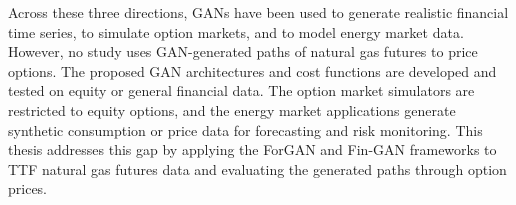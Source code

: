 Across these three directions, GANs have been used to generate realistic financial time series, to simulate option markets, and to model energy market data. However, no study uses GAN-generated paths of natural gas futures to price options. The proposed GAN architectures and cost functions are developed and tested on equity or general financial data. The option market simulators are restricted to equity options, and the energy market applications generate synthetic consumption or price data for forecasting and risk monitoring. This thesis addresses this gap by applying the ForGAN and Fin-GAN frameworks to TTF natural gas futures data and evaluating the generated paths through option prices.
